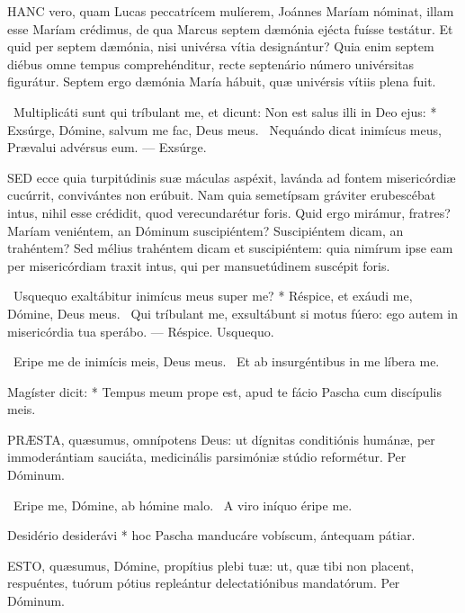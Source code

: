 
\lettrine[lines=2]{H}{ANC} vero, quam Lucas peccatrícem mulíerem, Joánnes Maríam nóminat, illam esse Maríam crédimus, de qua Marcus septem dæmónia ejécta fuísse testátur. Et quid per septem dæmónia, nisi univérsa vítia designántur? Quia enim septem diébus omne tempus comprehénditur, recte septenário número univérsitas figurátur. Septem ergo dæmónia María hábuit, quæ univérsis vítiis plena fuit.

\R\ Multiplicáti sunt qui tríbulant me, et dicunt: Non est salus illi in Deo ejus: * Exsúrge, Dómine, salvum me fac, Deus meus. \V\ Nequándo dicat inimícus meus, Prævalui advérsus eum. --- Exsúrge.


\lettrine[lines=2]{S}{ED} ecce quia turpitúdinis suæ máculas aspéxit, lavánda ad fontem misericórdiæ cucúrrit, convivántes non erúbuit. Nam quia semetípsam gráviter erubescébat intus, nihil esse crédidit, quod verecundarétur foris. Quid ergo mirámur, fratres? Maríam veniéntem, an Dóminum suscipiéntem? Suscipiéntem dicam, an trahéntem? Sed mélius trahéntem dicam et suscipiéntem: quia nimírum ipse eam per misericórdiam traxit intus, qui per mansuetúdinem suscépit foris.

\R\ Usquequo exaltábitur inimícus meus super me? * Réspice, et exáudi me, Dómine, Deus meus. \V\ Qui tríbulant me, exsultábunt si motus fúero: ego autem in misericórdia tua sperábo. --- Réspice. Usquequo.

\V\ Eripe me de inimícis meis, Deus meus. \R\ Et ab insurgéntibus in me líbera me.

 Magíster dicit: * Tempus meum prope est, apud te fácio Pascha cum discípulis meis.


\lettrine[lines=2]{P}{RÆSTA}, quæsumus, omnípotens Deus: ut dígnitas conditiónis humánæ, per immoderántiam sauciáta, medicinális parsimóniæ stúdio reformétur. Per Dóminum.

\V\ Eripe me, Dómine, ab hómine malo. \R\ A viro iníquo éripe me.

 Desidério desiderávi * hoc Pascha manducáre vobíscum, ántequam pátiar.


\lettrine[lines=2]{E}{STO}, quæsumus, Dómine, propítius plebi tuæ: ut, quæ tibi non placent, respuéntes, tuórum pótius repleántur delectatiónibus mandatórum. Per Dóminum.

